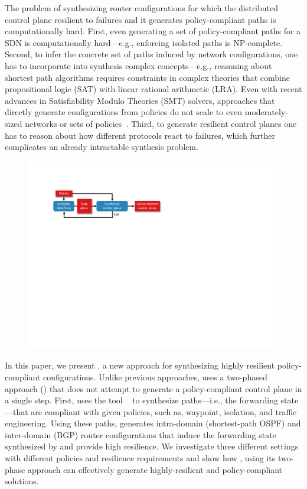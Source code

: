 The problem of synthesizing router configurations
for which the distributed control plane 
resilient to failures and it
generates policy-compliant paths 
is computationally hard. 
First, even generating a set of policy-compliant 
paths for a SDN  is 
computationally hard---e.g., enforcing isolated
paths is NP-complete. 
Second, to infer the concrete
set of paths induced by network configurations, 
one has to incorporate
into synthesis
complex concepts---e.g., reasoning about shortest path algorithms
requires constraints in complex
theories that combine propositional logic (SAT) 
with linear rational
arithmetic (LRA). Even with recent 
advances in Satisfiability Modulo Theories
(SMT) solvers, 
approaches that directly generate configurations  from policies
do not scale to
even moderately-sized networks or 
sets of policies~\cite{synet}.
Third, to generate resilient control planes one has to reason
about how different protocols react to failures, 
which further complicates an already intractable synthesis
problem. 

\begin{figure}
	\includegraphics[width=0.49\columnwidth]{figures/architecture.pdf}
	\label{fig:architecture}
\end{figure}

In this paper, we present \name, a new approach for synthesizing
highly resilient policy-compliant configurations.
Unlike previous approaches, \name uses a two-phased approach 
() 
that does not attempt to generate 
a policy-compliant control plane in a single step.
First, \name 
uses the tool \genesis~\cite{genesis}
to synthesize paths---i.e., the forwarding state---that are compliant
with given policies, such as, waypoint, isolation,
and traffic engineering.
Using these paths, \name generates 
intra-domain (shortest-path OSPF) and inter-domain (BGP) router configurations
that induce the forwarding
state synthesized by \genesis and provide high resilience. 
We investigate three different settings with different policies and resilience requirements
and show how \genesis, using its two-phase approach can effectively generate
highly-resilient and policy-compliant solutions.

